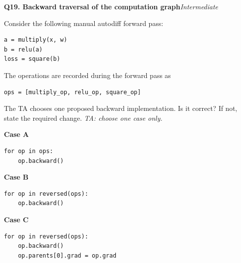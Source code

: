 \documentclass[11pt]{article}
\newif\ifshowanswers
\newenvironment{question}[3]{%
  \par\medskip
  \noindent\textbf{Q#1. #2}\hfill\textit{#3}\par\smallskip
}{\par\medskip}
\newcommand{\answer}[1]{%
  \ifshowanswers
    \begin{quote}\small\textbf{Expected answer:} #1\end{quote}
  \fi
}
\newcommand{\marking}[1]{%
  \ifshowanswers
    \begin{quote}\small\textbf{1 mark:} #1\end{quote}
  \fi
}
\newcommand{\casesnote}{\textit{TA: choose one case only.}}
\begin{document}
\begin{question}{19}{Backward traversal of the computation graph}{Intermediate}
Consider the following manual autodiff forward pass:

\begin{verbatim}
a = multiply(x, w)
b = relu(a)
loss = square(b)
\end{verbatim}

The operations are recorded during the forward pass as

\begin{verbatim}
ops = [multiply_op, relu_op, square_op]
\end{verbatim}

The TA chooses one proposed backward implementation. Is it correct? If not,
state the required change. \casesnote

\textbf{Case A}
\begin{verbatim}
for op in ops:
    op.backward()
\end{verbatim}

\textbf{Case B}
\begin{verbatim}
for op in reversed(ops):
    op.backward()
\end{verbatim}

\textbf{Case C}
\begin{verbatim}
for op in reversed(ops):
    op.backward()
    op.parents[0].grad = op.grad
\end{verbatim}

\answer{
Case A: Incorrect. The operations are being differentiated in forward order.
Backward must begin at the loss and traverse the recorded operations in reverse
order.

Case B: Correct, assuming each operation's backward function propagates and
accumulates its gradients into its parents.

Case C: Potentially incorrect. A parent's gradient should generally be
accumulated rather than blindly overwritten, because the same tensor may
contribute to the loss through multiple paths in the computation graph.
}

\marking{Student correctly judges the chosen implementation and identifies
reverse traversal and, for Case C, gradient accumulation as the key issue.}
\end{question}
\end{document}
